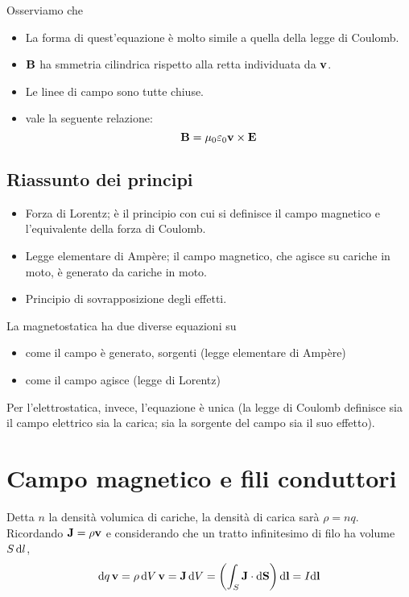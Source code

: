 Osserviamo che
\begin{itemize}
    \item La forma di quest'equazione è molto simile a quella della legge di Coulomb.
    \item $\mathbf{B}$ ha smmetria cilindrica rispetto alla retta individuata da $\mathbf{v}$.
    \item Le linee di campo sono tutte chiuse.
    \item vale la seguente relazione:
        \begin{equation}
            \mathbf{B} = \mu_0 \varepsilon_0 \mathbf{v} \times \mathbf{E}
        \end{equation}
\end{itemize}

\subsection{Riassunto dei principi}

\begin{itemize}
    \item Forza di Lorentz; è il principio con cui si definisce il campo magnetico e l'equivalente della forza di Coulomb.
    \item Legge elementare di Ampère; il campo magnetico, che agisce su cariche in moto, è generato da cariche in moto.
    \item Principio di sovrapposizione degli effetti.
\end{itemize}

La magnetostatica ha due diverse equazioni su
\begin{itemize}
    \item come il campo è generato, sorgenti (legge elementare di Ampère)
    \item come il campo agisce (legge di Lorentz)
\end{itemize}

Per l'elettrostatica, invece, l'equazione è unica (la legge di Coulomb definisce sia il campo elettrico sia la carica; sia la sorgente del campo sia il suo effetto).


\section{Campo magnetico e fili conduttori}

Detta $n$ la densità volumica di cariche, la densità di carica sarà $\rho = n q$.
Ricordando $\mathbf{J} = \rho \mathbf{v}$ e considerando che un tratto infinitesimo di filo ha volume $S \, \mathrm{d} l$,
\begin{equation}
\label{eq:corrente_infinitesima}
    \mathrm{d} q \, \mathbf{v} = \rho \, \mathrm{d} V \, \mathbf{v} = \mathbf{J} \, \mathrm{d} V =  \left( \int_S \mathbf{J} \cdot \mathrm{d} \mathbf{S} \right) \mathrm{d} \mathbf{l} = I \mathrm{d} \mathbf{l}
\end{equation}

